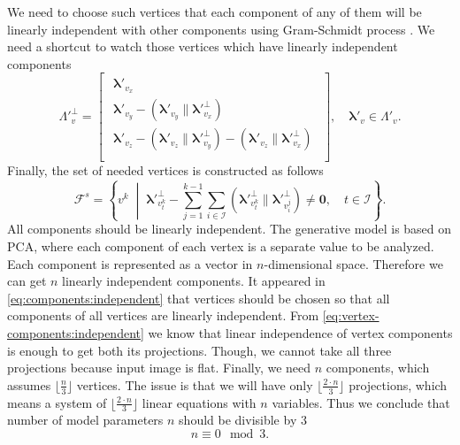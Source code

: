 We need to choose such vertices that each component of any of them
will be linearly independent with other components
using Gram-Schmidt process \cite{Orthogonalization:2008}.
We need a shortcut to watch those vertices
which have linearly independent components
\begin{equation*}
  \Lambda'^{\perp}_v = \begin{bmatrix}
    \begin{aligned}
      \pmb{\lambda}'_{v_x} \\
      \pmb{\lambda}'_{v_y}
        - \left( \pmb{\lambda}'_{v_y} \parallel \pmb{\lambda}'^{\perp}_{v_x} \right) \\
      \pmb{\lambda}'_{v_z}
        - \left( \pmb{\lambda}'_{v_z} \parallel \pmb{\lambda}'^{\perp}_{v_y} \right)
        - \left( \pmb{\lambda}'_{v_z} \parallel \pmb{\lambda}'^{\perp}_{v_x} \right) \\
    \end{aligned}
  \end{bmatrix},
  \quad \pmb{\lambda}'_v \in \Lambda'_v.
\end{equation*}
Finally, the set of needed vertices is constructed as follows
\begin{equation*}
  \mathcal{F}^s
  = \left\{ v^k \;\middle|\;
    \pmb{\lambda}'^{\perp}_{v^k_t}
    - \sum_{j = 1}^{k - 1} \sum_{i \in \mathcal{I}}
      \left( \pmb{\lambda}'^{\perp}_{v^k_t}
             \parallel \pmb{\lambda}'^{\perp}_{v^j_i} \right)
    \neq \pmb{0},
    \quad t \in \mathcal{I}
  \right\}.
\end{equation*}
All components should be linearly independent.
The generative model is based on PCA,
where each component of each vertex is a separate value to be analyzed.
Each component is represented as a vector in $n$-dimensional space.
Therefore we can get $n$ linearly independent components.
It appeared in \eqref{eq:components:independent}
that vertices should be chosen so that
all components of all vertices are linearly independent.
From \eqref{eq:vertex-components:independent} we know
that linear independence of vertex components
is enough to get both its projections.
Though, we cannot take all three projections because input image is flat.
Finally, we need $n$ components,
which assumes $\lfloor \frac{n}{3} \rfloor$ vertices.
The issue is that we will have only $\lfloor \frac{2 \cdot n}{3} \rfloor$
projections,
which means a system of $\lfloor \frac{2 \cdot n}{3} \rfloor$ linear equations
with $n$ variables.
Thus we conclude
that number of model parameters $n$ should be divisible by $3$
\begin{equation*}
  n \equiv 0 \mod 3.
\end{equation*}
